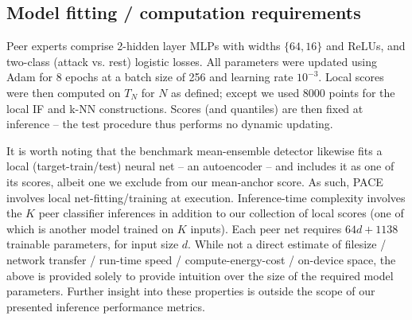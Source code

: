 \subsection{Model fitting / computation requirements} 
Peer experts comprise 2-hidden layer MLPs with widths $\{64,16\}$ and ReLUs, and two-class (attack vs. rest) logistic losses. All parameters were updated using Adam for 8 epochs at a batch size of 256 and learning rate $10^{-3}$. Local scores were then computed on $T_N$ for $N$ as defined; except we used 8000 points for the local IF and k-NN constructions. Scores (and quantiles) are then fixed at inference -- the test procedure thus performs no dynamic updating.

It is worth noting that the benchmark mean-ensemble detector likewise fits a local (target-train/test) neural net -- an autoencoder -- and includes it as one of its scores, albeit one we exclude from our mean-anchor score. As such, PACE involves local net-fitting/training at execution. Inference-time complexity involves the $K$ peer classifier inferences in addition to our collection of local scores (one of which is another model trained on $K$ inputs). Each peer net requires $64d + 1138$ trainable parameters, for input size $d$. While not a direct estimate of filesize / network transfer / run-time speed / compute-energy-cost / on-device space, the above is provided solely to provide intuition over the size of the required model parameters. Further insight into these properties is outside the scope of our presented inference performance metrics.




